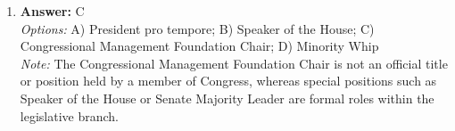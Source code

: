 \documentclass[12pt]{article}
\begin{document}
\begin{enumerate}[label=\arabic*.]
\\ \textit{Note:} Inefficient balancing or buckpassing by states can lead to a more competitive international system because it creates power vacuums and uncertainty, prompting states to engage in more aggressive strategies to secure their interests and influence.
\item \textbf{Answer:} C
\\ \textit{Options:} A) President pro tempore; B) Speaker of the House; C) Congressional Management Foundation Chair; D) Minority Whip
\\ \textit{Note:} The Congressional Management Foundation Chair is not an official title or position held by a member of Congress, whereas special positions such as Speaker of the House or Senate Majority Leader are formal roles within the legislative branch.
\end{enumerate}
\end{document}

